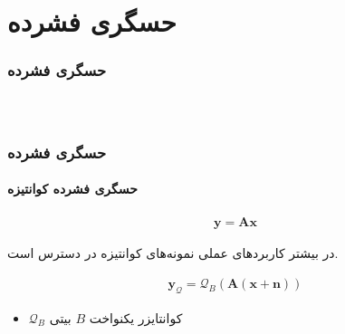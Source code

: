 \begin{frame}
\tableofcontents
\end{frame}


\section{حسگری فشرده\hfill}
\begin{frame}
\frametitle{حسگری فشرده}

\begin{columns} 
\begin{figure}
	\centering
	
\end{figure}
\end{columns}
\end{frame}
\begin{frame}
\frametitle{حسگری فشرده}
\framesubtitle{حسگری فشرده کوانتیزه}
\begin{align}
\label{eq2}
\bm{y}=\bm{A}\bm{x}
\end{align}
\pause
\begin{block}{}
\centering
در بیشتر کاربرد‌های عملی نمونه‌های کوانتیزه در دسترس است.
\end{block}

\begin{align}
\label{eq3}
\bm{y}_{\mathcal{Q}} = \mathcal{Q}_{B}\left(\bm{A}(\bm{x}+\bm{n})\right)
\end{align}
\begin{itemize}
\item{$\mathcal{Q}_{B}$
کوانتایزر یکنواخت
$B$
بیتی}
\end{itemize}

\end{frame}
